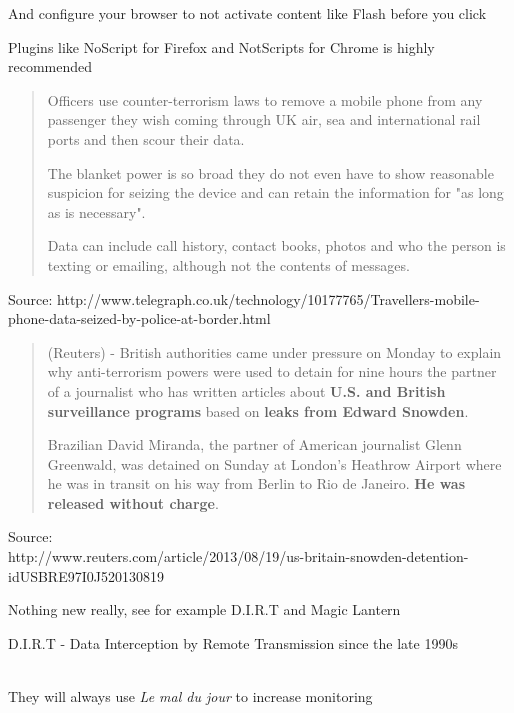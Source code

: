 \documentclass[20pt,landscape,a4paper,footrule]{foils}
\begin{document}
And configure your browser to not activate content like Flash before you click

Plugins like NoScript for Firefox and NotScripts for Chrome is highly recommended


\begin{quote}
Officers use counter-terrorism laws to remove a mobile phone from any passenger they wish coming through UK air, sea and international rail ports and then scour their data.

The blanket power is so broad they do not even have to show reasonable suspicion for seizing the device and can retain the information for "as long as is necessary".

Data can include call history, contact books, photos and who the person is texting or emailing, although not the contents of messages.
\end{quote}


{\small Source:
http://www.telegraph.co.uk/technology/10177765/Travellers-mobile-phone-data-seized-by-police-at-border.html}



\begin{quote}
(Reuters) - British authorities came under pressure on Monday to explain why anti-terrorism powers were used to detain for nine hours the partner of a journalist who has written articles about {\bf U.S. and British surveillance programs} based on {\bf leaks from Edward Snowden}.

Brazilian David Miranda, the partner of American journalist Glenn Greenwald, was detained on Sunday at London's Heathrow Airport where he was in transit on his way from Berlin to Rio de Janeiro. {\bf He was released without charge}.
\end{quote}

{\small Source:\\
{http://www.reuters.com/article/2013/08/19/us-britain-snowden-detention-idUSBRE97I0J520130819}}



\begin{list1}
\item Nothing new really, see for example D.I.R.T and Magic Lantern
\item D.I.R.T - Data Interception by Remote Transmission since the late 1990s\\
\\

\item They will always use \emph{Le mal du jour} to increase monitoring
\end{list1}
\end{document}

